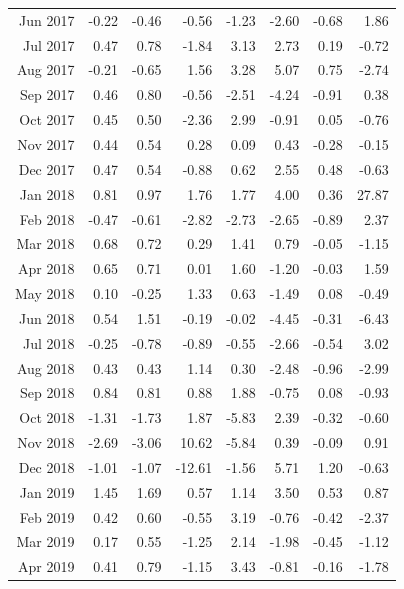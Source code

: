 \begin{tabularx}{\textwidth}{rrrrrrrr}
  Jun 2017 & -0.22 & -0.46 & -0.56 & -1.23 & -2.60 & -0.68 & 1.86 \\ 
  Jul 2017 & 0.47 & 0.78 & -1.84 & 3.13 & 2.73 & 0.19 & -0.72 \\ 
  Aug 2017 & -0.21 & -0.65 & 1.56 & 3.28 & 5.07 & 0.75 & -2.74 \\ 
  Sep 2017 & 0.46 & 0.80 & -0.56 & -2.51 & -4.24 & -0.91 & 0.38 \\ 
  Oct 2017 & 0.45 & 0.50 & -2.36 & 2.99 & -0.91 & 0.05 & -0.76 \\ 
  Nov 2017 & 0.44 & 0.54 & 0.28 & 0.09 & 0.43 & -0.28 & -0.15 \\ 
  Dec 2017 & 0.47 & 0.54 & -0.88 & 0.62 & 2.55 & 0.48 & -0.63 \\ 
  Jan 2018 & 0.81 & 0.97 & 1.76 & 1.77 & 4.00 & 0.36 & 27.87 \\ 
  Feb 2018 & -0.47 & -0.61 & -2.82 & -2.73 & -2.65 & -0.89 & 2.37 \\ 
  Mar 2018 & 0.68 & 0.72 & 0.29 & 1.41 & 0.79 & -0.05 & -1.15 \\ 
  Apr 2018 & 0.65 & 0.71 & 0.01 & 1.60 & -1.20 & -0.03 & 1.59 \\ 
  May 2018 & 0.10 & -0.25 & 1.33 & 0.63 & -1.49 & 0.08 & -0.49 \\ 
  Jun 2018 & 0.54 & 1.51 & -0.19 & -0.02 & -4.45 & -0.31 & -6.43 \\ 
  Jul 2018 & -0.25 & -0.78 & -0.89 & -0.55 & -2.66 & -0.54 & 3.02 \\ 
  Aug 2018 & 0.43 & 0.43 & 1.14 & 0.30 & -2.48 & -0.96 & -2.99 \\ 
  Sep 2018 & 0.84 & 0.81 & 0.88 & 1.88 & -0.75 & 0.08 & -0.93 \\ 
  Oct 2018 & -1.31 & -1.73 & 1.87 & -5.83 & 2.39 & -0.32 & -0.60 \\ 
  Nov 2018 & -2.69 & -3.06 & 10.62 & -5.84 & 0.39 & -0.09 & 0.91 \\ 
  Dec 2018 & -1.01 & -1.07 & -12.61 & -1.56 & 5.71 & 1.20 & -0.63 \\ 
  Jan 2019 & 1.45 & 1.69 & 0.57 & 1.14 & 3.50 & 0.53 & 0.87 \\ 
  Feb 2019 & 0.42 & 0.60 & -0.55 & 3.19 & -0.76 & -0.42 & -2.37 \\ 
  Mar 2019 & 0.17 & 0.55 & -1.25 & 2.14 & -1.98 & -0.45 & -1.12 \\ 
  Apr 2019 & 0.41 & 0.79 & -1.15 & 3.43 & -0.81 & -0.16 & -1.78 \\ 
   \hline
\end{tabularx}
